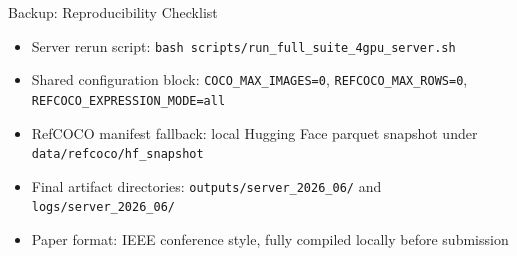 \documentclass[aspectratio=169,professionalfonts]{beamer}
\begin{document}
\begin{frame}{Backup: Reproducibility Checklist}
  \small
  \begin{itemize}
    \item Server rerun script: \texttt{bash scripts/run\_full\_suite\_4gpu\_server.sh}
    \item Shared configuration block: \texttt{COCO\_MAX\_IMAGES=0}, \texttt{REFCOCO\_MAX\_ROWS=0}, \texttt{REFCOCO\_EXPRESSION\_MODE=all}
    \item RefCOCO manifest fallback: local Hugging Face parquet snapshot under \texttt{data/refcoco/hf\_snapshot}
    \item Final artifact directories: \texttt{outputs/server\_2026\_06/} and \texttt{logs/server\_2026\_06/}
    \item Paper format: IEEE conference style, fully compiled locally before submission
  \end{itemize}
\end{frame}
\end{document}
